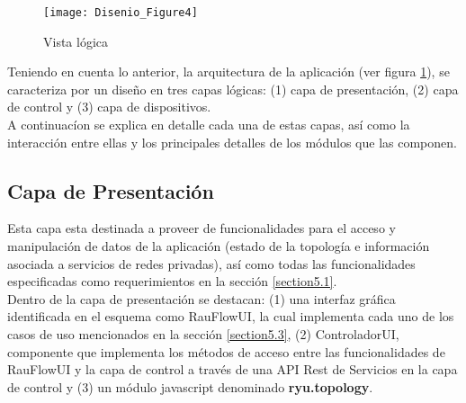 


\begin{figure}[h] 
\centering    
\texttt{[image: Disenio\_Figure4]}
\caption[Vista l\'ogica]{Vista l\'ogica}
\label{fig:VistaComponentes2}
\end{figure}

Teniendo en cuenta lo anterior, la arquitectura de la aplicaci\'on (ver figura \ref{fig:VistaComponentes2}), se caracteriza por un diseño en tres capas l\'ogicas: (1) capa de presentaci\'on, (2) capa de control y (3) capa de dispositivos.\\

A continuac\'ion se explica en detalle cada una de estas capas, as\'i como la interacci\'on entre ellas y los principales detalles de los m\'odulos que las componen.

\subsection{Capa de Presentación}
Esta capa esta destinada a proveer de funcionalidades para el acceso y manipulaci\'on de datos de la aplicaci\'on (estado de la topolog\'ia e informaci\'on asociada a servicios de redes privadas), as\'i como todas las funcionalidades especificadas como requerimientos en la secci\'on 
\ref{section5.1}.\\ 

Dentro de la capa de presentaci\'on se destacan: (1) una interfaz gr\'afica identificada en el esquema como RauFlowUI, la cual implementa cada uno de los casos de uso mencionados en la secci\'on \ref{section5.3}, (2) ControladorUI, componente que implementa los m\'etodos de acceso entre las funcionalidades de RauFlowUI y la capa de control a trav\'es de una API Rest de Servicios en la capa de control y (3) un m\'odulo javascript denominado \textbf{ryu.topology}.\\ 

